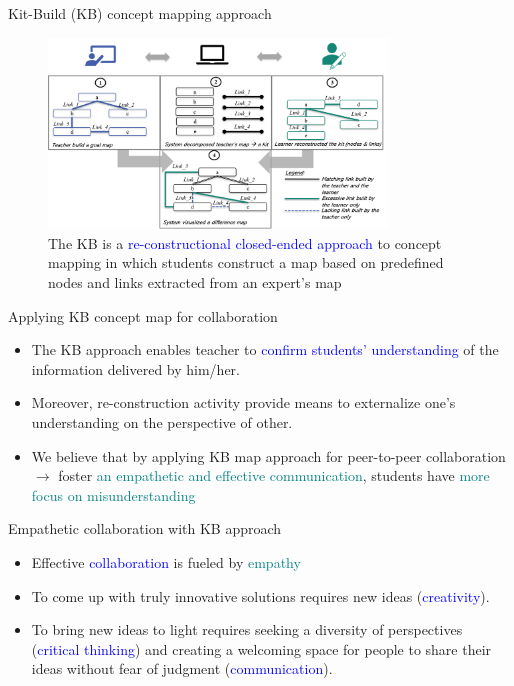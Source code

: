 \begin{frame}{Kit-Build (KB) concept mapping approach \cite{Hirashima2015}}

    \begin{figure}[tb]
        \begin{center}
            \includegraphics[width=90mm]{images/kb_flow.png}
        \end{center}
        \caption{The KB is a \textcolor{blue}{re-constructional closed-ended approach} to concept mapping
        in which students construct a map based on predefined nodes and
        links extracted from an expert's map \cite{Hirashima2015,Hirashima2019ReconstructionalReconstruction}}
        \label{intro::kbmap}
    \end{figure}
\end{frame}

\begin{frame}{Applying KB concept map for collaboration}
    \begin{itemize}
        \item<1> The KB approach enables teacher to \textcolor{blue}{confirm students' understanding}
        of the information delivered by him/her. 
        \item<2> Moreover, re-construction activity provide means to externalize 
        one's understanding on the perspective of other.
        \item<3> We believe that by applying KB map approach for peer-to-peer collaboration  $\longrightarrow$ foster \textcolor{teal}{an empathetic and effective communication}, students have \textcolor{teal}{more focus on misunderstanding}

    \end{itemize}
\end{frame}

\begin{frame}{Empathetic collaboration with KB approach}
    \begin{itemize}
        \item <+-> Effective \textcolor{blue}{collaboration} is fueled by \textcolor{teal}{empathy} 
        \item  <+-> To come up with truly  innovative solutions requires new ideas (\textcolor{blue}{creativity}). 
        \item  <+-> To bring new ideas 
        to light requires seeking a diversity of perspectives (\textcolor{blue}{critical thinking})
        and creating a welcoming space for people to share 
        their ideas without fear of judgment (\textcolor{blue}{communication}).
    \end{itemize}
\end{frame}

